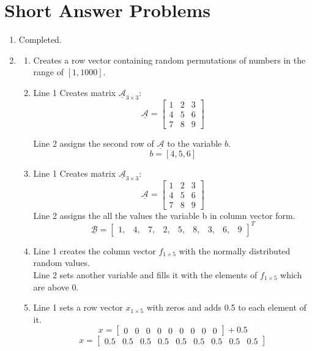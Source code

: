 \documentclass{article}
\newcommand\mat[1]{\mathcal{\underline{#1}}}
\begin{document}
\section{Short Answer Problems}
	\begin{enumerate}
		\item Completed.
		
		\item 
			\begin{enumerate}
				\item Creates a row vector containing random permutations of numbers in the
				range of  $[1, 1000]$.
				
				\item Line 1 Creates matrix $\mat{A}_{3\times3}$:
				$$\mat{A}= \begin{bmatrix}1 & 2 & 3 \\ 4 & 5 & 6 \\7 & 8 & 9\end{bmatrix}$$
				
				Line 2 assigns the second row of $\mat{A}$ to the variable $b$.
				$$b = [4,5,6]$$

				\item Line 1 Creates matrix $\mat{A}_{3\times3}$:
				$$\mat{A}= \begin{bmatrix}1 & 2 & 3 \\ 4 & 5 & 6 \\7 & 8 & 9\end{bmatrix}$$
				Line 2 assigns the all the values the variable b in column vector form.
				$$\mat{B}= \begin{bmatrix}1, & 4, & 7, & 2, & 5, & 8, & 3, & 6, & 9
				\end{bmatrix}^T$$

				\item Line 1 creates the column vector $f_{1\times5}$ with the normally
				distributed random values. \\
				Line 2 sets another variable and fills it with the elements of $f_{1\times5}$ which are above 0.

				\item Line 1 sets a row vector  $x_{1\times5}$ with zeros and adds 0.5 to
				each element of it.
				$$x = \begin{bmatrix}0 & 0 & 0 & 0 & 0 & 0 & 0 & 0 & 0 \end{bmatrix}+0.5$$
				$$x = \begin{bmatrix}0.5 & 0.5 & 0.5 & 0.5 & 0.5 & 0.5 & 0.5 & 0.5 & 0.5\end{bmatrix}$$
					

\end{enumerate}
\end{enumerate}
\end{document}

